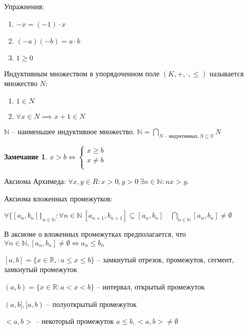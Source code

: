 \documentclass{book}
\newcommand\N{\ensuremath{\mathbb{N}}}
\newcommand\R{\ensuremath{\mathbb{R}}}
\renewcommand\O{\ensuremath{\emptyset}}
\theoremstyle{definition}
\newtheorem*{note}{Замечание}
\begin{document}
        Упражнения:
        \begin{enumerate}
            \item $-x = (-1)\cdot x$
            \item $(-a)(-b) = a\cdot b$
            \item $1\geqslant 0$
        \end{enumerate}
        \begin{definition}
            Индуктивным множеством в упорядоченном поле $(K, +, \cdot , \leqslant )$ называется множество $N$:
           \begin{enumerate}
               \item $1\in N$
               \item $\forall x\in N \implies  x+1\in N$
           \end{enumerate}

           $\N $ -- наименьшее индуктивное множество. $\N  = \bigcap\limits_{N\text{ -- индуктивных}, N\subseteq \R}N $
        \end{definition}
        \begin{note}
            $x>b \iff \begin{cases}
                x\geqslant b\\
                x\neq b\\
            \end{cases}$
        \end{note}
        Аксиома Архимеда: $\forall x, y\in R: x>0, y>0\ \exists  n\in \N : nx>y$.

        Аксиома вложенных промежутков: 
        
        $\forall \{[a_n, b_n]\}_{n\in \N }: \forall n\in \N\ [a_{n+1}, b_{n+1}] \subseteq [a_n, b_n]\quad \bigcap\limits_{n\in \N } [a_n, b_n]\neq \O  $

        В аксиоме о вложенных промежутках предполагается, что\\
        $\forall  n\in \N , [a_n, b_n] \neq \O  \iff  a_n \leqslant  b_n$

        $[a,b] = \{x\in \R,: a\leqslant x\leqslant b\}$ -- замкнутый отрезок, промежуток, сегмент, замкнутый промежуток

        $(a,b) = \{x\in \R: a<x<b\}$ -- интервал, открытый промежуток

        $(a,b], [a,b)$ -- полуоткрытый промежуток

        $<a,b>$ -- некоторый промежуток $a\leqslant b, <a,b> \neq \O $
\end{document}
